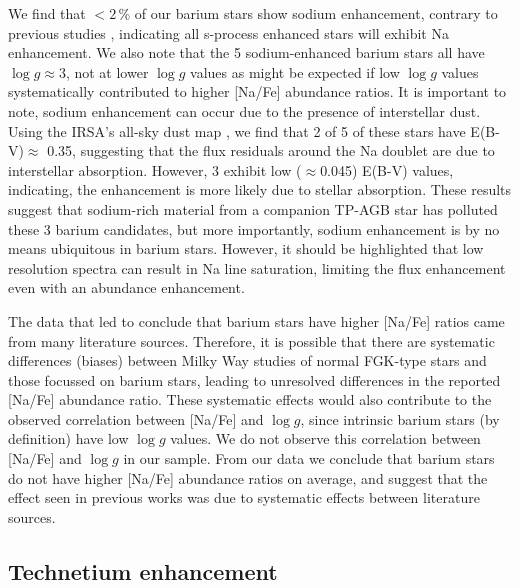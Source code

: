 \documentclass[a4paper,fleqn,usenatbib]{mnras}
\begin{document}
We find that $<2$\,\% of our barium stars show sodium enhancement, contrary to previous studies \citep[e.g.,][]{decastro2016}, indicating all s-process enhanced stars will exhibit Na enhancement. We also note that the 5 sodium-enhanced barium stars all have $\log{g} \approx 3$, not at lower $\log{g}$ values as might be expected if low $\log{g}$ values systematically contributed to higher [Na/Fe] abundance ratios. It is important to note, sodium enhancement can occur due to the presence of interstellar dust. Using the IRSA's all-sky dust map \citep{schlafly2011}, we find that 2 of 5 of these stars have E(B-V)$\approx$ 0.35, suggesting that the flux residuals around the Na doublet are due to interstellar absorption. However, 3 exhibit low ($\approx$0.045) E(B-V) values, indicating, the enhancement is more likely due to stellar absorption. These results suggest that sodium-rich material from a companion TP-AGB star has polluted these 3 barium candidates, but more importantly, sodium enhancement is by no means ubiquitous in barium stars. However, it should be highlighted that low resolution spectra can result in Na line saturation, limiting the flux enhancement even with an abundance enhancement.

The data that led \citet{decastro2016} to conclude that barium stars have higher [Na/Fe] ratios came from many literature sources. Therefore, it is possible that there are systematic differences (biases) between Milky Way studies of normal FGK-type stars and those focussed on barium stars, leading to unresolved differences in the reported [Na/Fe] abundance ratio. These systematic effects would also contribute to the observed correlation between [Na/Fe] and $\log{g}$, since intrinsic barium stars (by definition) have low $\log{g}$ values. We do not observe this correlation between [Na/Fe] and $\log{g}$ in our sample. From our data we conclude that barium stars do not have higher [Na/Fe] abundance ratios on average, and suggest that the effect seen in previous works was due to systematic effects between literature sources.

\subsection{Technetium enhancement}
\end{document}
